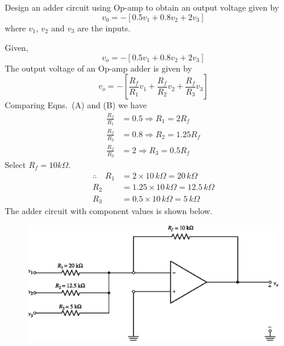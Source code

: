 
\eject

\begin{example}\label{exam5.21}
Design an adder circuit using Op-amp to obtain an output voltage given by
$$
v_{0}=-[0.5v_{1}+0.8v_{2}+2v_{3}]
$$
where $v_{1}$, $v_{2}$ and $v_{3}$ are the inputs.
\end{example}

\begin{solution}
Given,
\begin{equation*}
v_{o}=-[0.5v_{1}+0.8v_{2}+2v_{3}]\tag{A}
\end{equation*}
The output voltage of an Op-amp adder is given by
\begin{equation*}
v_{o}=-\left[\frac{R_{f}}{R_{1}}v_{1}+\frac{R_{f}}{R_{2}}v_{2}+\frac{R_{f}}{R_{3}}v_{3}\right]\tag{B}
\end{equation*}
Comparing Eqns.~(A) and (B) we have
\begin{align*}
\frac{R_{f}}{R_{1}} &= 0.5\Rightarrow R_{1}=2R_{f}\\[3pt]
\frac{R_{f}}{R_{2}} &= 0.8\Rightarrow R_{2}=1.25 R_{f}\\[3pt]
\frac{R_{f}}{R_{3}} &= 2 \Rightarrow R_{3}=0.5 R_{f}
\end{align*}
Select $R_{f}=10 k\Omega$.
\begin{align*}
\therefore\quad R_{1} &= 2\times 10\, k\Omega = 20\,k\Omega\\[3pt]
R_{2} &= 1.25 \times 10\,k\Omega = 12.5\,k\Omega\\[3pt]
R_{3} &= 0.5 \times 10\,k\Omega = 5\,k\Omega
\end{align*}
The adder circuit with component values is shown below.
\begin{figure}[H]
\centering
\includegraphics{chap4/S3-EE-06-IN013.eps}
\end{figure}
\vskip -1cm
\end{solution}

